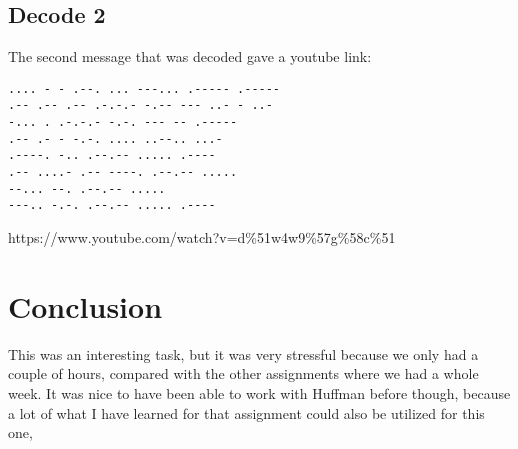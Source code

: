 \documentclass[a4paper,11pt]{article}
\begin{document}
\subsection{Decode 2}
The second message that was decoded gave a youtube link:
\begin{verbatim}
.... - - .--. ... ---... .----- .----- 
.-- .-- .-- .-.-.- -.-- --- ..- - ..- 
-... . .-.-.- -.-. --- -- .-----
.-- .- - -.-. .... ..--.. ...- 
.----. -.. .--.-- ..... .---- 
.-- ....- .-- ----. .--.-- ..... 
--... --. .--.-- .....
---.. -.-. .--.-- ..... .---- 
\end{verbatim}


https://www.youtube.com/watch?v=d\%51w4w9\%57g\%58c\%51 


\section{Conclusion}
This was an interesting task, but it was very stressful because we only had a couple of hours, compared with the other assignments where we had a whole week. It was nice to have been able to work with Huffman before though, because a lot of what I have learned for that assignment could also be utilized for this one,
\end{document}
